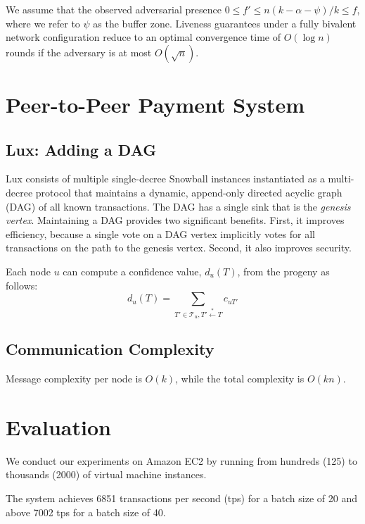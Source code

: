 \documentclass[11pt]{article}
\begin{document}
We assume that the observed adversarial presence $0 \leq f' \leq
n(k - \alpha - \psi)/k \leq f$, where we refer to $\psi$ as the buffer zone.
Liveness guarantees under
a fully bivalent network configuration reduce to an optimal
convergence time of $O(\log n)$ rounds if the adversary is at
most $O(\sqrt{n})$.

\section{Peer-to-Peer Payment System}\label{sec:payment}

\subsection{Lux: Adding a DAG}

Lux consists of multiple single-decree Snowball instances instantiated as a multi-decree protocol that maintains
a dynamic, append-only directed acyclic graph (DAG) of all
known transactions. The DAG has a single sink that is the
\emph{genesis vertex}. Maintaining a DAG provides two significant
benefits. First, it improves efficiency, because a single vote
on a DAG vertex implicitly votes for all transactions on the
path to the genesis vertex. Second, it also improves security.

Each node $u$ can compute a confidence value, $d_u(T)$, from
the progeny as follows:
\begin{equation}
d_u(T) = \sum_{T' \in \mathcal{T}_u, T' \stackrel{*}{\leftarrow} T} c_{uT'}
\end{equation}

\subsection{Communication Complexity}

Message complexity per node is $O(k)$, while the total complexity is $O(kn)$.

\section{Evaluation}\label{sec:eval}

We conduct our experiments on Amazon EC2 by running
from hundreds (125) to thousands (2000) of virtual machine
instances.

The system achieves 6851 transactions per second (tps) for a batch size of
20 and above 7002 tps for a batch size of 40.
\end{document}
